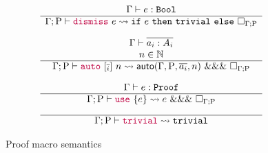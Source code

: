 \begin{figure*}
{\[\begin{array}{c}
\\[1em]
  \Gamma \vdash e:\mathtt{Bool} \\
  \hline
  \Gamma; \mathrm{P}
  \vdash
  {\color{purple}\ensuremath{\mathtt{dismiss}}} ~ e
  \rightsquigarrow
  \mathtt{if} ~ e ~ \mathtt{then} ~ \mathtt{trivial} ~ \mathtt{else} ~ \Box_{\Gamma ; \mathrm{P}}
\\[1em]
  \Gamma \vdash \overline{a_i:A_i} \\
  n \in \mathbb{N} \\
  \hline 
  \Gamma; \mathrm{P}
  \vdash 
  {\color{purple}\ensuremath{\mathtt{auto}}} ~ [\overline{_i}] ~ n
  \rightsquigarrow
  \mathsf{auto}(\Gamma, \mathrm{P}, \overline{a_i}, n) ~ \mathtt{\&\&\&} ~ \Box_{\Gamma ; \mathrm{P}}
\\[1em]
  \Gamma \vdash e : \mathtt{Proof} \\
  \hline
  \Gamma; \mathrm{P}
  \vdash 
  {\color{purple}\ensuremath{\mathtt{use}}} ~ \{ e \} 
  \rightsquigarrow
  e ~ \mathtt{\&\&\&} ~ \Box_{\Gamma ; \mathrm{P}}
\\[1em]
  \hline
  \Gamma; \mathrm{P}
  \vdash
  {\color{purple}\ensuremath{\mathtt{trivial}}}
  \rightsquigarrow
  \mathtt{trivial}
\end{array}
\]
}
\caption{Proof macro semantics}
\label{fig:proof-macro-semantics}
\end{figure*}

\begin{verbatim}
 
\end{verbatim}

